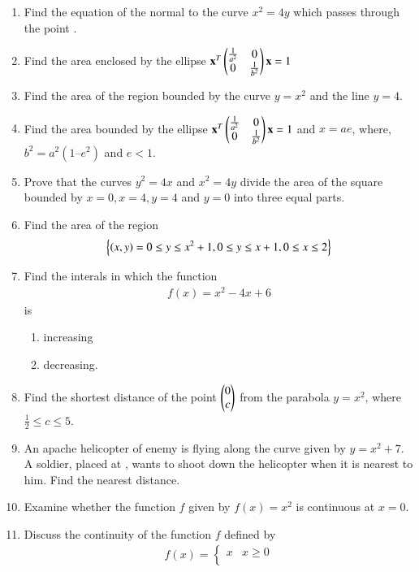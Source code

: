\begin{enumerate}[label=\arabic*.,ref=\thesubsection.\theenumi]
\begin{enumerate}
\end{enumerate}
 \item Find the equation of the normal to the curve $x^2= 4y$
which passes through the point .
%
\item Find the area enclosed by the ellipse
$
\mathbf{x}^T\begin{pmatrix}\frac{1}{a^2} & 0 \\ 0 & \frac{1}{b^2}\end{pmatrix}\mathbf{x} = 1
$
%
\item Find the area of the region bounded by the curve $y = x^2$
and the line $y = 4$.
%
\item Find the area bounded by the ellipse
$
\mathbf{x}^T\begin{pmatrix}\frac{1}{a^2} & 0 \\ 0 & \frac{1}{b^2}\end{pmatrix}\mathbf{x} = 1
$
and $x = ae$, where, $b^2 = a^2 (1 – e^2 )$ and $e < 1$.
%
\item Prove that the curves $y^2 = 4x$ and $x^2 = 4y$ divide the area of the square bounded by $x = 0, x = 4, y =4$ and $y = 0$ into three equal parts.
%
\item Find the area of the region
\begin{align}
\left\{\left(x,y\right) = 0\le y\le x^2+1, 0\le y \le x+1, 0 \le x \le 2\right\}
\end{align}
\item Find the interals in which the function 
\begin{align}
f(x)  = x^2-4x+6
\end{align}
%
is 
\begin{enumerate}
\item increasing
\item decreasing.
\end{enumerate}
%
\item Find the shortest distance of the point $\begin{pmatrix}0\\c\end{pmatrix}$ from the parabola $y = x^2$, where $\frac{1}{2} \le c \le 5$.
%
\item An apache helicopter of enemy is flying along the curve given by $y = x^2+7$.  A soldier, placed at , wants to shoot down the helicopter when it is nearest to him.  Find  the nearest distance.
%
\item Examine whether the function $f$ given by $f(x) = x^2$ is continuous at $x = 0$.
%
\item Discuss the continuity of the function $f$ defined by 
%
\begin{align}
f(x)  = 
\begin{cases}
x & x \ge 0
\\

\end{cases}
\end{align}
\end{enumerate}
